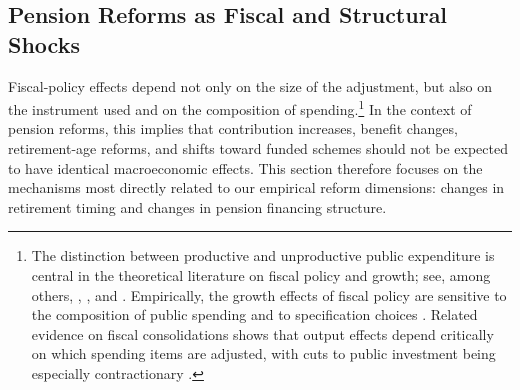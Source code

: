 \documentclass[11pt,english,a4paper, twoside, authoryear]{article}
\begin{document}




\subsection{Pension Reforms as Fiscal and Structural Shocks}



Fiscal-policy effects depend not only on the size of the adjustment, but also on the instrument used and on the composition of spending.\footnote{The distinction between productive and unproductive public expenditure is central in the theoretical literature on fiscal policy and growth; see, among others, \citet{Barro1990}, \citet{Devarajan1996}, and \citet{Sardoni2024}. Empirically, the growth effects of fiscal policy are sensitive to the composition of public spending and to specification choices \citep{MoralBenito2012, Gemmell2016}. Related evidence on fiscal consolidations shows that output effects depend critically on which spending items are adjusted, with cuts to public investment being especially contractionary \citep{Ardanaz2021}.} In the context of pension reforms, this implies that contribution increases, benefit changes, retirement-age reforms, and shifts toward funded schemes should not be expected to have identical macroeconomic effects. This section therefore focuses on the mechanisms most directly related to our empirical reform dimensions: changes in retirement timing and changes in pension financing structure.
\end{document}

